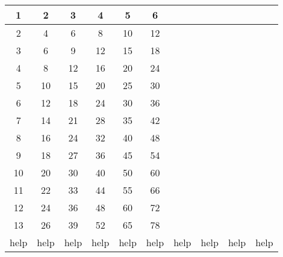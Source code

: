 \documentclass[12pt]{article}
\begin{document}
 \begin{tabular}{ |c|c|c|c|c|c|c|c|c|c|}
\hline
1 & 2 & 3 & 4 & 5 & 6 &  &  &  &   \\
\hline
2 & 4 & 6 & 8 & 10 & 12 &  &  &  &   \\
\hline
3 & 6 & 9 & 12 & 15 & 18 &  &  &  &   \\
\hline
4 & 8 & 12 & 16 & 20 & 24 &  &  &  &   \\
\hline
5 & 10 & 15 & 20 & 25 & 30 &  &  &  &   \\
\hline
6 & 12 & 18 & 24 & 30 & 36 &  &  &  &   \\
\hline
7 & 14 & 21 & 28 & 35 & 42 &  &  &  &   \\
\hline
8 & 16 & 24 & 32 & 40 & 48 &  &  &  &   \\
\hline
9 & 18 & 27 & 36 & 45 & 54 &  &  &  &   \\
\hline
10 & 20 & 30 & 40 & 50 & 60 &  &  &  &   \\
\hline
11 & 22 & 33 & 44 & 55 & 66 &  &  &  &   \\
\hline
12 & 24 & 36 & 48 & 60 & 72 &  &  &  &   \\
\hline
13 & 26 & 39 & 52 & 65 & 78 &  &  &  &   \\
\hline
help & help & help & help & help & help & help & help & help & help  \\
\hline
\end{tabular}
\end{document}

